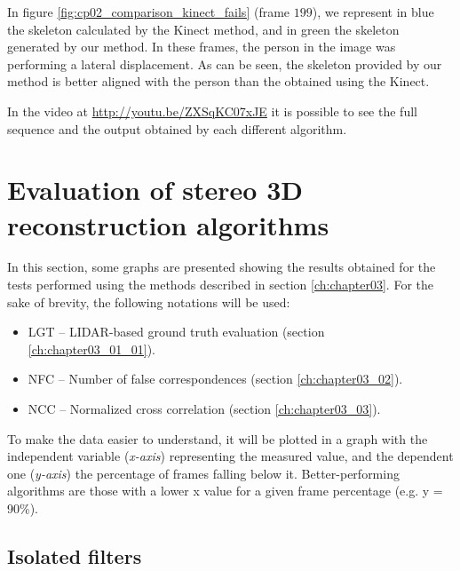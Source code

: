 In figure \ref{fig:cp02_comparison_kinect_fails} (frame $199$), we represent in blue the skeleton calculated by the 
Kinect method, and in green the skeleton generated by our method. In these frames, the person in the 
image was performing a lateral displacement. As can be seen, the skeleton provided by our method is better aligned with
the person than the obtained using the Kinect. 

In the video at \url{http://youtu.be/ZXSqKC07xJE} it is possible to see the full sequence and the output obtained by each different algorithm.


\graphicspath{{./images/chapter03/bmps/}{./images/chapter03/vects/}{./images/chapter03/}}
\section{Evaluation of stereo 3D reconstruction algorithms}\label{ch:chapter03_04}

In this section, some graphs are presented showing the results obtained for the tests performed using the methods described in section \ref{ch:chapter03}. For the sake of brevity, the following notations will be used:
\begin{itemize}
 \item LGT – LIDAR-based ground truth evaluation (section \ref{ch:chapter03_01_01}).
 \item NFC – Number of false correspondences (section \ref{ch:chapter03_02}).
 \item NCC – Normalized cross correlation (section \ref{ch:chapter03_03}).
\end{itemize}

To make the data easier to understand, it will be plotted in a graph with the independent variable (\emph{x-axis}) representing the measured value, and the dependent one (\emph{y-axis}) the percentage of frames falling below it. Better-performing algorithms are those with a lower x value for a given frame percentage (e.g. y = 90\%).

\subsection{Isolated filters}\label{ch:chapter03_04_01}

